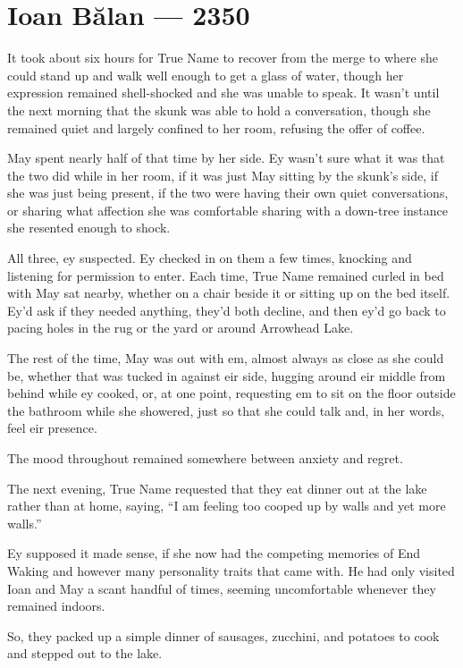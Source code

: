 \hypertarget{ioan-bux103lan-2350}{%
\chapter{Ioan Bălan — 2350}\label{ioan-bux103lan-2350}}

It took about six hours for True Name to recover from the merge to where she could stand up and walk well enough to get a glass of water, though her expression remained shell-shocked and she was unable to speak. It wasn't until the next morning that the skunk was able to hold a conversation, though she remained quiet and largely confined to her room, refusing the offer of coffee.

May spent nearly half of that time by her side. Ey wasn't sure what it was that the two did while in her room, if it was just May sitting by the skunk's side, if she was just being present, if the two were having their own quiet conversations, or sharing what affection she was comfortable sharing with a down-tree instance she resented enough to shock.

All three, ey suspected. Ey checked in on them a few times, knocking and listening for permission to enter. Each time, True Name remained curled in bed with May sat nearby, whether on a chair beside it or sitting up on the bed itself. Ey'd ask if they needed anything, they'd both decline, and then ey'd go back to pacing holes in the rug or the yard or around Arrowhead Lake.

The rest of the time, May was out with em, almost always as close as she could be, whether that was tucked in against eir side, hugging around eir middle from behind while ey cooked, or, at one point, requesting em to sit on the floor outside the bathroom while she showered, just so that she could talk and, in her words, feel eir presence.

The mood throughout remained somewhere between anxiety and regret.

The next evening, True Name requested that they eat dinner out at the lake rather than at home, saying, ``I am feeling too cooped up by walls and yet more walls.''

Ey supposed it made sense, if she now had the competing memories of End Waking and however many personality traits that came with. He had only visited Ioan and May a scant handful of times, seeming uncomfortable whenever they remained indoors.

So, they packed up a simple dinner of sausages, zucchini, and potatoes to cook and stepped out to the lake.

